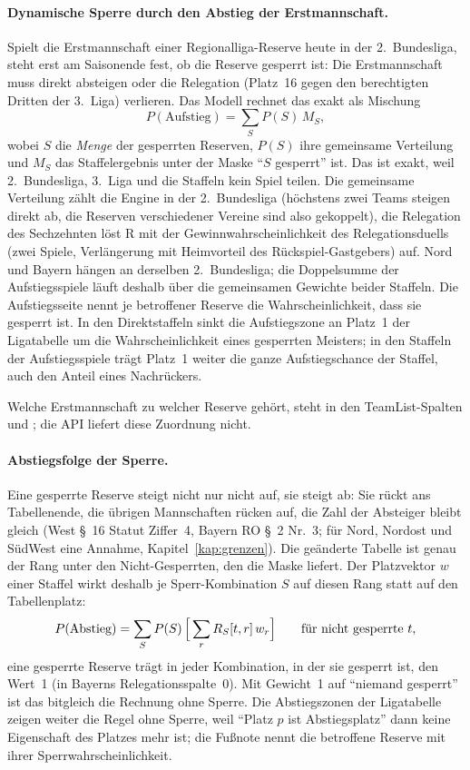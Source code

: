 \paragraph{Dynamische Sperre durch den Abstieg der Erstmannschaft.}
Spielt die Erstmannschaft einer Regionalliga-Reserve heute in der
2.~Bundesliga, steht erst am Saisonende fest, ob die Reserve gesperrt ist: Die
Erstmannschaft muss direkt absteigen oder die Relegation (Platz~16 gegen den
berechtigten Dritten der 3.~Liga) verlieren. Das Modell rechnet das exakt als
Mischung
\begin{equation}
  P(\text{Aufstieg}) = \sum_S P(S)\, M_S ,
\end{equation}
wobei $S$ die \emph{Menge} der gesperrten Reserven, $P(S)$ ihre gemeinsame
Verteilung und $M_S$ das Staffelergebnis unter der Maske \enquote{$S$ gesperrt}
ist. Das ist exakt, weil 2.~Bundesliga, 3.~Liga und die Staffeln kein Spiel
teilen. Die gemeinsame Verteilung zählt die Engine in der 2.~Bundesliga
(höchstens zwei Teams steigen direkt ab, die Reserven verschiedener Vereine
sind also gekoppelt), die Relegation des Sechzehnten löst R mit der
Gewinnwahrscheinlichkeit des Relegationsduells (zwei Spiele, Verlängerung mit
Heimvorteil des Rückspiel-Gastgebers) auf. Nord und
Bayern hängen an derselben 2.~Bundesliga; die Doppelsumme der Aufstiegsspiele
läuft deshalb über die gemeinsamen Gewichte beider Staffeln. Die Aufstiegsseite
nennt je betroffener Reserve die Wahrscheinlichkeit, dass sie gesperrt ist. In
den Direktstaffeln sinkt die Aufstiegszone an Platz~1 der Ligatabelle um die
Wahrscheinlichkeit eines gesperrten Meisters; in den Staffeln der Aufstiegsspiele
trägt Platz~1 weiter die ganze Aufstiegschance der Staffel, auch den Anteil
eines Nachrückers.

Welche Erstmannschaft zu welcher Reserve gehört, steht in den TeamList-Spalten
 und ; die API
liefert diese Zuordnung nicht.

\paragraph{Abstiegsfolge der Sperre.}
Eine gesperrte Reserve steigt nicht nur nicht auf, sie steigt ab: Sie rückt ans
Tabellenende, die übrigen Mannschaften rücken auf, die Zahl der Absteiger
bleibt gleich (West §~16 Statut Ziffer~4, Bayern RO §~2 Nr.~3; für Nord,
Nordost und SüdWest eine Annahme, Kapitel~\ref{kap:grenzen}). Die geänderte
Tabelle ist genau der Rang unter den Nicht-Gesperrten, den die Maske liefert.
Der Platzvektor $w$ einer Staffel wirkt deshalb je Sperr-Kombination $S$ auf
diesen Rang statt auf den Tabellenplatz:
\begin{equation}
  P(\text{Abstieg}) = \sum_S P(S)\,\Bigl[\,\sum_r R_S[t, r]\, w_r\Bigr]
  \qquad\text{für nicht gesperrte } t,
\end{equation}
eine gesperrte Reserve trägt in jeder Kombination, in der sie gesperrt ist,
den Wert~1 (in Bayerns Relegationsspalte~0). Mit Gewicht~1 auf
\enquote{niemand gesperrt} ist das bitgleich die Rechnung ohne Sperre. Die
Abstiegszonen der Ligatabelle zeigen weiter die Regel ohne Sperre, weil
\enquote{Platz $p$ ist Abstiegsplatz} dann keine Eigenschaft des Platzes mehr
ist; die Fußnote nennt die betroffene Reserve mit ihrer Sperrwahrscheinlichkeit.
